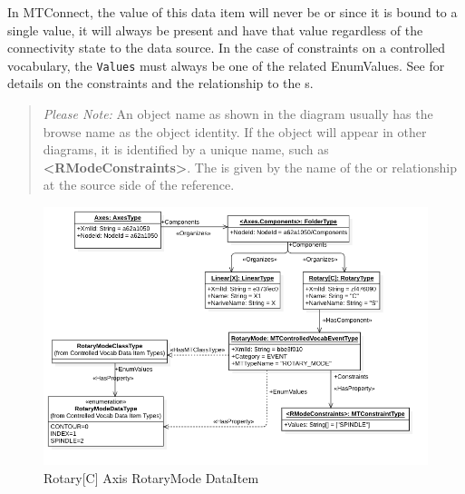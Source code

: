 In MTConnect, the value of this data item will never be  or  since it is bound to a single value, it will always be present and have that value regardless of the connectivity state to the data source. In the case of constraints on a controlled vocabulary, the \texttt{Values} must always be one of the related EnumValues. See \cite{MTCPart2} for details on the constraints and the relationship to the s.

\begin{quote}
    \textit{Please Note:} An object name as shown in the diagram usually has the browse name as the object identity. If the object will appear in other diagrams, it is identified by a unique name, such as \textbf{<RModeConstraints>}. The  is given by the name of the  or  relationship at the source side of the reference. 
\end{quote}

\begin{figure}[ht]
    \centering
    \includegraphics[width=1.0\textwidth]{diagrams/mtconnect-mapping/rotary-c-rotary-mode.png}
    \caption{Rotary[C] Axis RotaryMode DataItem}
    \label{fig:rotary-c-rotary-mode}
\end{figure}

\FloatBarrier

